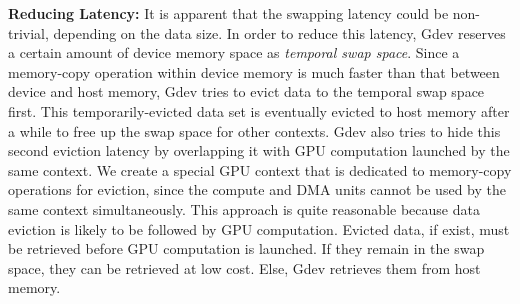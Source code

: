 \textbf{Reducing Latency:}
It is apparent that the swapping latency could be non-trivial, depending
on the data size.
In order to reduce this latency, Gdev reserves a certain amount of
device memory space as \textit{temporal swap space}.
Since a memory-copy operation within device memory is much faster than
that between device and host memory, Gdev tries to evict data to the
temporal swap space first.
This temporarily-evicted data set is eventually evicted to host memory
after a while to free up the swap space for other contexts. 
Gdev also tries to hide this second eviction latency by overlapping it
with GPU computation launched by the same context.
We create a special GPU context that is dedicated to memory-copy
operations for eviction, since the compute and DMA units cannot be used
by the same context simultaneously.
This approach is quite reasonable because data eviction is likely to be
followed by GPU computation.
Evicted data, if exist, must be retrieved before GPU computation is
launched. 
If they remain in the swap space, they can be retrieved at low cost.
Else, Gdev retrieves them from host memory.
